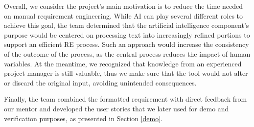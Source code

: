 Overall, we consider the project's main motivation is to reduce the time needed on manual requirement engineering. While AI can play several different roles to achieve this goal, the team determined that the artificial intelligence component’s purpose would be centered on processing text into increasingly refined portions to support an efficient RE process. Such an approach would increase the consistency of the outcome of the process, as the central process reduces the impact of human variables. At the meantime, we recognized that knowledge from an experienced project manager is still valuable, thus we make sure that the tool would not alter or discard the original input, avoiding unintended consequences. 

Finally, the team combined the formatted requirement with direct feedback from our mentor and developed the user stories that we later used for demo and verification purposes, as presented in Section \ref{demo}.